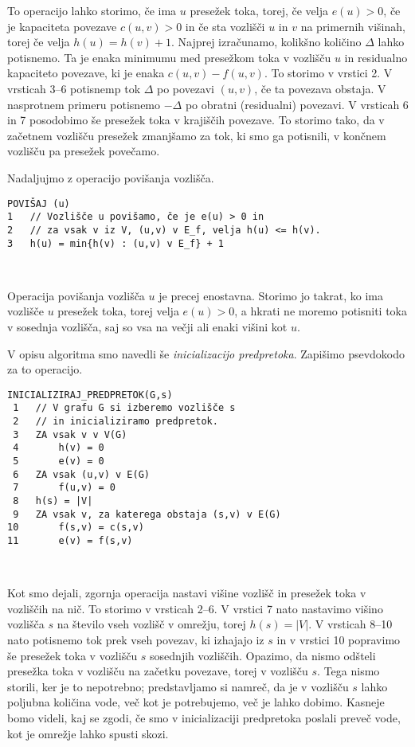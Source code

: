 \documentclass[mat1]{fmfdelo}
\begin{document}
To operacijo lahko storimo, če ima $u$ presežek toka, torej, če velja $e(u) > 0$, če je kapaciteta povezave $c(u,v) > 0$ in če sta vozlišči $u$ in $v$ na primernih višinah, torej če velja $h(u) = h(v) + 1$. Najprej izračunamo, kolikšno količino $\Delta$ lahko potisnemo. Ta je enaka minimumu med presežkom toka v vozlišču $u$ in residualno kapaciteto povezave, ki je enaka $c(u,v) - f(u,v)$. To storimo v vrstici 2. V vrsticah 3--6 potisnemp tok $\Delta$ po povezavi $(u,v)$, če ta povezava obstaja. V nasprotnem primeru potisnemo $-\Delta$ po obratni (residualni) povezavi. V vrsticah 6 in 7 posodobimo še presežek toka v krajiščih povezave. To storimo tako, da v začetnem vozlišču presežek zmanjšamo za tok, ki smo ga potisnili, v končnem vozlišču pa presežek povečamo.

Nadaljujmo z operacijo povišanja vozlišča.\\

\begin{verbatim}
POVIŠAJ (u)
1   // Vozlišče u povišamo, če je e(u) > 0 in
2   // za vsak v iz V, (u,v) v E_f, velja h(u) <= h(v).
3   h(u) = min{h(v) : (u,v) v E_f} + 1
\end{verbatim}~

Operacija povišanja vozlišča $u$ je precej enostavna. Storimo jo takrat, ko ima vozlišče $u$ presežek toka, torej velja $e(u) > 0$, a hkrati ne moremo potisniti toka v sosednja vozlišča, saj so vsa na večji ali enaki višini kot $u$.

V opisu algoritma smo navedli še \textit{inicializacijo predpretoka}. Zapišimo psevdokodo za to operacijo.\\

\begin{verbatim}
INICIALIZIRAJ_PREDPRETOK(G,s)
 1   // V grafu G si izberemo vozlišče s
 2   // in inicializiramo predpretok.
 3   ZA vsak v v V(G)
 4       h(v) = 0
 5       e(v) = 0
 6   ZA vsak (u,v) v E(G)
 7       f(u,v) = 0
 8   h(s) = |V|
 9   ZA vsak v, za katerega obstaja (s,v) v E(G)
10       f(s,v) = c(s,v)
11       e(v) = f(s,v)
\end{verbatim}~

Kot smo dejali, zgornja operacija nastavi višine vozlišč in presežek toka v vozliščih na nič. To storimo v vrsticah 2--6. V vrstici 7 nato nastavimo višino vozlišča $s$ na število vseh vozlišč v omrežju, torej $h(s) = |V|$. V vrsticah 8--10 nato potisnemo tok prek vseh povezav, ki izhajajo iz $s$ in v vrstici 10 popravimo še presežek toka v vozlišču $s$ sosednjih vozliščih. Opazimo, da nismo odšteli presežka toka v vozlišču na začetku povezave, torej v vozlišču $s$. Tega nismo storili, ker je to nepotrebno; predstavljamo si namreč, da je v vozlišču $s$ lahko poljubna količina vode, več kot je potrebujemo, več je lahko dobimo. Kasneje bomo videli, kaj se zgodi, če smo v inicializaciji predpretoka poslali preveč vode, kot je omrežje lahko spusti skozi.
\end{document}
